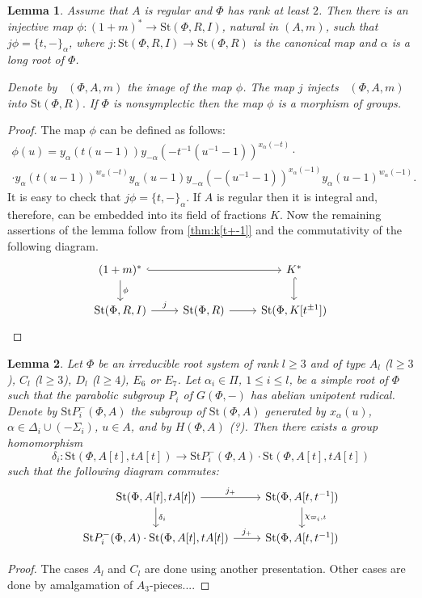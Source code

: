 \documentclass[oneside,12pt]{amsart}
\numberwithin{equation}{section}
\newtheorem{lem}{Lemma}
\numberwithin{lem}{section}
\theoremstyle{definition}
\theoremstyle{remark}
\newcommand{\Stb}{\mathrm{St}}
\DeclareMathOperator{\Stsymt}{{Sym}^t}
\begin{document}
\begin{lem}\label{lem:tul3.1zh}
Assume that $A$ is regular and $\Phi$ has rank at least $2$.
Then there is an injective map $\phi\colon (1+m)^*\to\Stb(\Phi, R, I)$, natural in $(A,m)$,
such that $j \phi = \{t, -\}_\alpha$, where $j\colon\Stb(\Phi,R,I)\to \Stb(\Phi,R)$ is the canonical map and $\alpha$ is a long root of $\Phi$.

Denote by $\Stsymt(\Phi, A, m)$ the image of the map $\phi$.
The map $j$ injects $\Stsymt(\Phi, A, m)$ into $\Stb(\Phi, R).$
If $\Phi$ is nonsymplectic then the map $\phi$ is a morphism of groups.
\end{lem}
\begin{proof}
The map $\phi$ can be defined as follows:
\begin{multline*}
\phi(u)=y_\alpha(t(u-1))y_{-\alpha}(-t^{-1}(u^{-1}-1))^{x_\alpha(-t)}\cdot \\
\cdot y_\alpha(t(u-1))^{w_\alpha(-t)}
y_\alpha(u-1)y_{-\alpha}(-(u^{-1}-1))^{x_\alpha(-1)}y_\alpha(u-1)^{w_\alpha(-1)}.
\end{multline*}
It is easy to check that $j \phi = \{t, -\}_\alpha$.
If $A$ is regular then it is integral and, therefore, can be embedded into its field of fractions $K$.
Now the remaining assertions of the lemma follow from \cref{thm:k[t+-1]} and the commutativity of the following diagram.
\[\begin{tikzcd}
 (1+m)^* \ar[hookrightarrow, rr] \ar[d, "\phi"] &  & K^* \ar[hookrightarrow, d] \\
  \Stb(\Phi ,R, I) \ar[r, "j"]                      & \Stb(\Phi, R) \ar[r] & \Stb(\Phi, K[t^{\pm 1}])
\end{tikzcd} \qedhere\]
\end{proof}

\begin{lem}\label{lem:sigma-X}
Let $\Phi$ be an irreducible root system of rank $l\ge 3$ and of type $A_l$ ($l\ge 3$), $C_l$ ($l\ge 3$), $D_l$ ($l\ge 4$),
$E_6$ or $E_7$. Let $\alpha_i\in\Pi$, $1\le i\le l$, be a simple root of $\Phi$ such that the
parabolic subgroup $P_i$ of $G(\Phi,-)$ has abelian unipotent radical. Denote by $\Stb P_i^-(\Phi,A)$
the subgroup of $\Stb(\Phi,A)$ generated by $x_\alpha(u)$, $\alpha\in\Delta_i\cup(-\Sigma_i)$, $u\in A$,
and by $H(\Phi,A)$ (?).
Then there exists a group homomorphism
$$
\delta_i:\Stb(\Phi,A[t],tA[t])\to \Stb P_i^-(\Phi,A)\cdot \Stb(\Phi,A[t],tA[t])
$$
such that the following diagram commutes:
 \[\begin{tikzcd}
\Stb(\Phi,A[t],tA[t]) \arrow[r, "j_+"] \arrow[d, "\delta_i"] & \Stb(\Phi,A[t, t^{-1}])  \ar[d, "\chi_{\varpi_i,t}"] \\
\Stb P_i^-(\Phi,A)\cdot \Stb(\Phi,A[t],tA[t]) \arrow[r, "j_+"] &  \Stb(\Phi,A[t, t^{-1}])
\end{tikzcd}\]
\end{lem}
\begin{proof}
The cases $A_l$ and $C_l$ are done using another presentation. Other cases are done by amalgamation
of $A_3$-pieces....
\end{proof}
\end{document}
